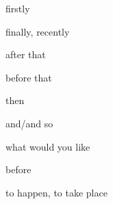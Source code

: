 \begin{flashcard}{\LARGE firstly}
\LARGE {}
\end{flashcard}
\begin{flashcard}{\LARGE finally, recently}
\LARGE {}
\end{flashcard}
\begin{flashcard}{\LARGE after that}
\LARGE {}
\end{flashcard}
\begin{flashcard}{\LARGE before that}
\LARGE {}
\end{flashcard}
\begin{flashcard}{\LARGE then}
\LARGE {}
\end{flashcard}
\begin{flashcard}{\LARGE and/and so}
\LARGE {}
\end{flashcard}
\begin{flashcard}{\LARGE what would you like}
\LARGE {}
\end{flashcard}
\begin{flashcard}{\LARGE before}
\LARGE {}
\end{flashcard}
\begin{flashcard}{\LARGE to happen, to take place}
\LARGE {}
\end{flashcard}

